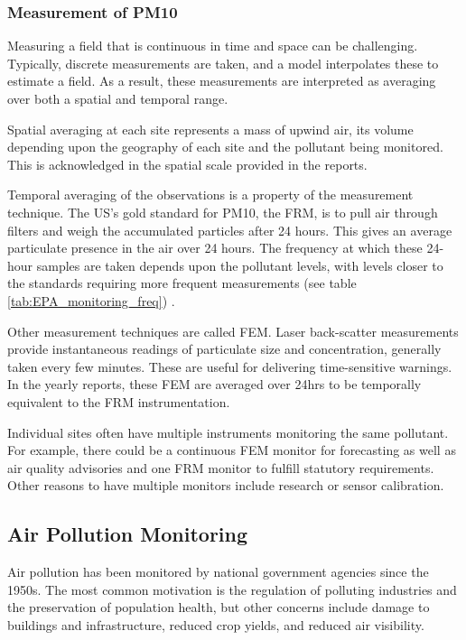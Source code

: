 \subsubsection{Measurement of PM10}
\label{subsubsec:pm10measurement}
Measuring a field that is continuous in time and space can be challenging.  Typically, discrete measurements are taken, and a model interpolates these to estimate a field.  As a result, these measurements are interpreted as averaging over both a spatial and temporal range.

Spatial averaging at each site represents a mass of upwind air, its volume depending upon the geography of each site and the pollutant being monitored.  This is acknowledged in the spatial scale provided in the reports.   

Temporal averaging of the observations is a property of the measurement technique.  The US's gold standard for \ac{PM10}, the \ac{FRM}, is to pull air through filters and weigh the accumulated particles after 24 hours.  This gives an average particulate presence in the air over 24 hours.  The frequency at which these 24-hour samples are taken depends upon the pollutant levels, with levels closer to the standards requiring more frequent measurements (see table \ref{tab:EPA_monitoring_freq}) 
\citep{CASCAQMD:2015}.

Other measurement techniques are called \ac{FEM}.  Laser back-scatter measurements provide instantaneous readings of particulate size and concentration, generally taken every few minutes.  These are useful for delivering time-sensitive warnings.  In the yearly reports, these \ac {FEM} are averaged over 24hrs to be temporally equivalent to the \ac{FRM} instrumentation.

Individual sites often have multiple instruments monitoring the same pollutant. For example, there could be a continuous \ac{FEM} monitor for forecasting as well as air quality advisories and one \ac{FRM} monitor to fulfill statutory requirements.  Other reasons to have multiple monitors include research or sensor calibration. 

\subsection{Air Pollution Monitoring}\label{sec:apmonitoring}
Air pollution has been monitored by national government agencies since the 1950s.  The most common motivation is the regulation of polluting industries and the preservation of population health, but other concerns include damage to buildings and infrastructure, reduced crop yields, and reduced air visibility.  

